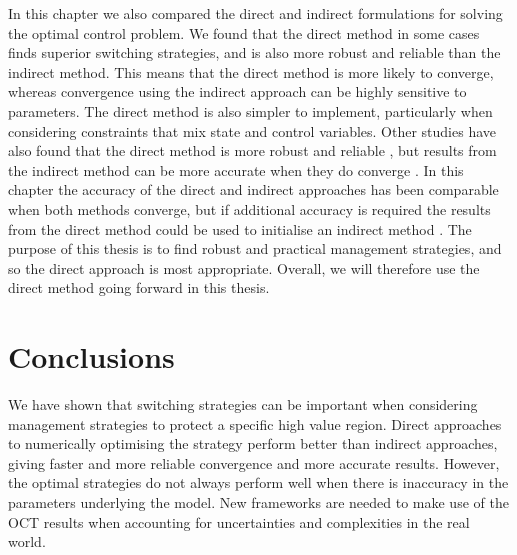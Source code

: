In this chapter we also compared the direct and indirect formulations for solving the optimal control problem. We found that the direct method in some cases finds superior switching strategies, and is also more robust and reliable than the indirect method. This means that the direct method is more likely to converge, whereas convergence using the indirect approach can be highly sensitive to parameters. The direct method is also simpler to implement, particularly when considering constraints that mix state and control variables. Other studies have also found that the direct method is more robust and reliable \citep{betts_practical_2010}, but results from the indirect method can be more accurate when they do converge \citep{rao_survey_2009}. In this chapter the accuracy of the direct and indirect approaches has been comparable when both methods converge, but if additional accuracy is required the results from the direct method could be used to initialise an indirect method \citep{von_direct_1992}. The purpose of this thesis is to find robust and practical management strategies, and so the direct approach is most appropriate. Overall, we will therefore use the direct method going forward in this thesis.

\section{Conclusions}

We have shown that switching strategies can be important when considering management strategies to protect a specific high value region. Direct approaches to numerically optimising the strategy perform better than indirect approaches, giving faster and more reliable convergence and more accurate results. However, the optimal strategies do not always perform well when there is inaccuracy in the parameters underlying the model. New frameworks are needed to make use of the OCT results when accounting for uncertainties and complexities in the real world.
